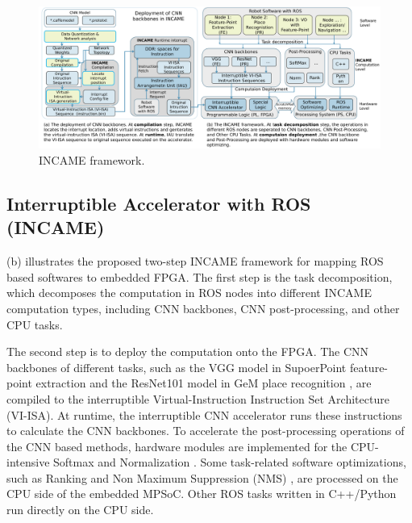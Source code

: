 \begin{figure}[t]
	\centering
    \includegraphics[width=0.99\linewidth]{fig/incame.pdf}
    \caption{ INCAME framework.}
	\label{fig:incame}
\end{figure}

\subsection{ Interruptible Accelerator with ROS (INCAME) }


(b) illustrates the proposed two-step INCAME framework for mapping ROS based softwares to embedded FPGA.
The first step is the task decomposition, which decomposes the computation in ROS nodes into different INCAME computation types, including CNN backbones, CNN post-processing, and other CPU tasks. 

The second step is to deploy the computation onto the FPGA. 
The CNN backbones of different tasks, such as the VGG model \cite{kim2016accurate} in SupoerPoint feature-point extraction \cite{detone2018superpoint} and the ResNet101 model \cite{he2016deep} in GeM place recognition \cite{radenovic2018fine}, are compiled to the interruptible Virtual-Instruction Instruction Set Architecture (VI-ISA). 
At runtime, the interruptible CNN accelerator runs these instructions to calculate the CNN backbones.
To accelerate the post-processing operations of the CNN based methods, hardware modules are implemented for the CPU-intensive Softmax \cite{Softmax-wiki} and Normalization \cite{Norm}. Some task-related software optimizations, such as Ranking and Non Maximum Suppression (NMS) \cite{NeubeckGool-NMS}, are processed on the CPU side of the embedded MPSoC\cite{MPSoC}.
Other ROS tasks written in C++/Python run directly on the CPU side.

